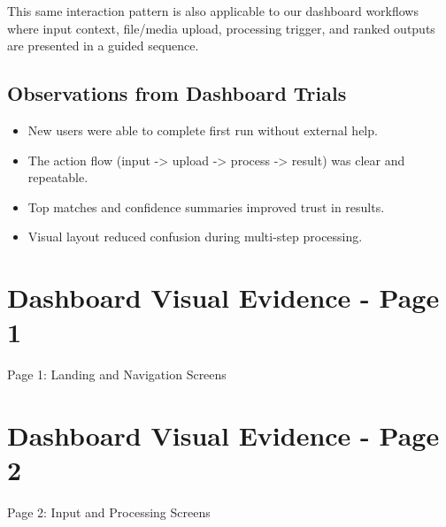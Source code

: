 This same interaction pattern is also applicable to our dashboard workflows where input context, file/media upload, processing trigger, and ranked outputs are presented in a guided sequence.

\subsection{Observations from Dashboard Trials}

\begin{itemize}
    \item New users were able to complete first run without external help.
    \item The action flow (input -> upload -> process -> result) was clear and repeatable.
    \item Top matches and confidence summaries improved trust in results.
    \item Visual layout reduced confusion during multi-step processing.
\end{itemize}

\clearpage
\section*{Dashboard Visual Evidence - Page 1}
\thispagestyle{empty}
\begin{center}
{\Large Page 1: Landing and Navigation Screens}\\[0.6cm]
\begin{minipage}[t]{0.47\textwidth}
\centering
{}
\end{minipage}
\hfill
\begin{minipage}[t]{0.47\textwidth}
\centering
{}
\end{minipage}
\end{center}

\clearpage
\section*{Dashboard Visual Evidence - Page 2}
\thispagestyle{empty}
\begin{center}
{\Large Page 2: Input and Processing Screens}\\[0.6cm]
\begin{minipage}[t]{0.47\textwidth}
\centering
{}
\end{minipage}
\hfill
\begin{minipage}[t]{0.47\textwidth}
\centering
{}
\end{minipage}
\end{center}

